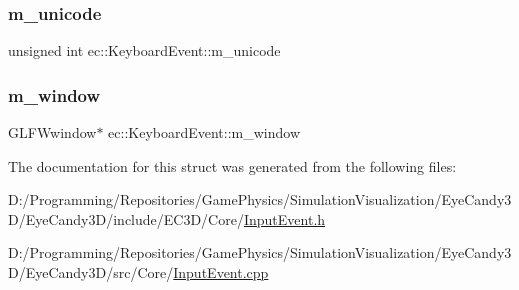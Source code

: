 \subsubsection{\texorpdfstring{m\+\_\+unicode}{m\_unicode}}
{\footnotesize\ttfamily unsigned int ec\+::\+Keyboard\+Event\+::m\+\_\+unicode}

\mbox{\label{structec_1_1_keyboard_event_a6de06c21e83612aeca727beedd93ae82}} 
\subsubsection{\texorpdfstring{m\+\_\+window}{m\_window}}
{\footnotesize\ttfamily G\+L\+F\+Wwindow$\ast$ ec\+::\+Keyboard\+Event\+::m\+\_\+window}



The documentation for this struct was generated from the following files\+:\begin{DoxyCompactItemize}
\item 
D\+:/\+Programming/\+Repositories/\+Game\+Physics/\+Simulation\+Visualization/\+Eye\+Candy3\+D/\+Eye\+Candy3\+D/include/\+E\+C3\+D/\+Core/\mbox{\hyperlink{_input_event_8h}{Input\+Event.\+h}}\item 
D\+:/\+Programming/\+Repositories/\+Game\+Physics/\+Simulation\+Visualization/\+Eye\+Candy3\+D/\+Eye\+Candy3\+D/src/\+Core/\mbox{\hyperlink{_input_event_8cpp}{Input\+Event.\+cpp}}\end{DoxyCompactItemize}
